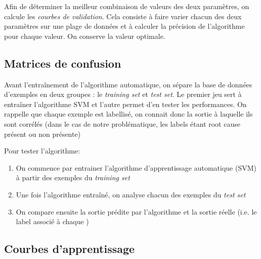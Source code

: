 Afin de déterminer la meilleur combinaison de valeurs des deux paramètres, on calcule les \emph{courbes de validation}. Cela consiste à faire varier chacun des deux paramètres sur une plage de données et à calculer la précision de l'algorithme pour chaque valeur. On conserve la valeur optimale. 

\subsection{Matrices de confusion}
\label{Industrialisation du produit: Performances de la solution:Matrices de confusion}
Avant l'entraînement de l'algorithme automatique, on sépare la base de données d'exemples en deux groupes : le \emph{training set} et \emph{test set}. Le premier jeu sert à entraîner l'algorithme SVM et l'autre permet d'en tester les performances. On rappelle que chaque exemple est labellisé, on connait donc la sortie à laquelle ils sont corrélés (dans le cas de notre problématique, les labels étant root cause présent ou non présente) 
\newline

Pour tester l'algorithme: 
\begin{enumerate}
	\item On commence par entrainer l'algorithme d'apprentissage automatique (SVM) à partir des exemples du \emph{training set}
	\item Une fois l'algorithme entraîné, on analyse chacun des exemples du \emph{test set}
	\item On compare ensuite la sortie prédite par l'algorithme et la sortie réelle (i.e. le label associé à chaque )
\end{enumerate}

\subsection{Courbes d'apprentissage}
\label{Industrialisation du produit: Performances de la solution:Courbes d'apprentissage}
